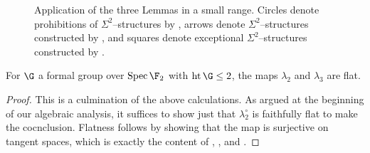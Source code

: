 \begin{figure}
\begin{center}
\end{center}
\caption{Application of the three Lemmas in a small range.  Circles denote prohibitions of \(\Sigma^2\)--structures by , arrows denote \(\Sigma^2\)--structures constructed by , and squares denote exceptional \(\Sigma^2\)--structures constructed by .}
\end{figure}

\begin{corollary}\label{LambdasAreFlat}
For \(\G\) a formal group over \(\Spec \F_2\) with \(\height \G \le 2\), the maps \(\lambda_2\) and \(\lambda_3\) are flat.
\end{corollary}
\begin{proof}
This is a culmination of the above calculations.  As argued at the beginning of our algebraic analysis, it suffices to show just that \(\lambda_2^\circ\) is faithfully flat to make the cocnclusion.  Flatness follows by showing that the map is surjective on tangent spaces, which is exactly the content of , , and .
\end{proof}


